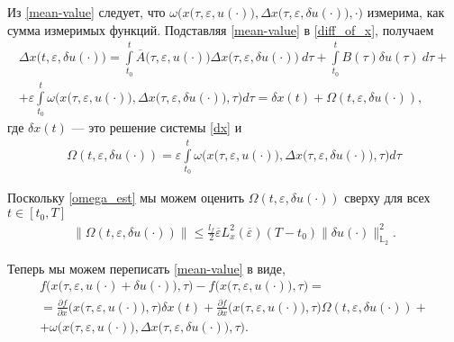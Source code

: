 \documentclass[../main.tex]{subfiles}
\begin{document}
Из \eqref{mean-value} следует, что $\omega\Big(x\big(\tau,\varepsilon, u(\cdot)\big),\Delta x\big(\tau, \varepsilon, \delta u(\cdot)\big),\cdot\big)$ измерима, как сумма измеримых функций.
Подставляя \eqref{mean-value} в \eqref{diff_of_x}, получаем
\begin{gather*}
    \Delta x\big(t, \varepsilon, \delta u(\cdot)\big)
    = \int\limits_{t_0}^t 
    \overline{A}\big(\tau,\varepsilon,u(\cdot)\big) 
    \Delta x\big(\tau, \varepsilon, \delta u(\cdot)\big)\ d\tau + 
    \int\limits_{t_0}^t B(\tau) \delta u(\tau)\ d\tau + \\ +
    \varepsilon\int\limits_{t_0}^t \omega\Big(x\big(\tau,\varepsilon, u(\cdot)\big),\Delta x\big(\tau, \varepsilon, \delta u(\cdot)\big),\tau\Big) d\tau = 
    \delta x(t) + \Omega(t,\varepsilon, \delta u(\cdot)),
\end{gather*}
где $\delta x(t)$ --- это решение системы \eqref{dx} и
\begin{gather*}
    \Omega(t,\varepsilon, \delta u(\cdot)) = \varepsilon\int\limits_{t_0}^t 
    \omega\Big(x\big(\tau,\varepsilon, u(\cdot)\big),\Delta x\big(\tau, \varepsilon, \delta u(\cdot)\big),\tau\Big) d\tau
\end{gather*}


Поскольку \eqref{omega_est} мы можем оценить $\Omega(t,\varepsilon, \delta u(\cdot)) $ сверху для всех $t \in [t_0, T]$
\begin{gather}
    \| \Omega(t,\varepsilon, \delta u(\cdot))\| \leqslant \frac{l_f}{2} \overline{\varepsilon} L_x^2(\overline{\varepsilon})(T-t_0)\|\delta u(\cdot)\|_{\mathbb{L}_2}^2.
\end{gather}

Теперь мы можем переписать \eqref{mean-value} в виде,  
\begin{gather*}
    f\Big(x\big(\tau,\varepsilon, u(\cdot) + \delta u(\cdot)\big),\tau\Big) -
    f\Big(x\big(\tau,\varepsilon, u(\cdot)\big),\tau\Big) = \\ =
    \frac{\partial f}{\partial x}  \Big(x\big(\tau,\varepsilon, u(\cdot)\big), \tau\Big) \delta x(t) + 
    \frac{\partial f}{\partial x} \Big(x\big(\tau,\varepsilon, u(\cdot)\big), \tau\Big) \Omega(t,\varepsilon, \delta u(\cdot))
    + \\ + 
    \omega\Big(x\big(\tau,\varepsilon, u(\cdot)\big),\Delta x\big(\tau, \varepsilon, \delta u(\cdot)\big),\tau\Big).
\end{gather*}
\end{document}
